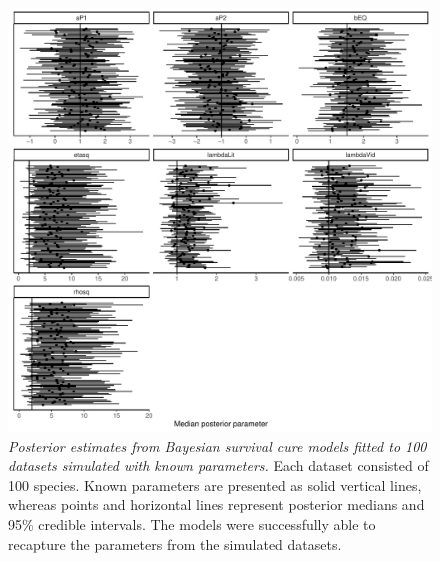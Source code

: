 \documentclass[
  man,floatsintext]{apa6}
\begin{document}
\begin{figure}
\centering
\includegraphics{manuscript_files/figure-latex/plotSurvCureSim-1.pdf}
\caption{\label{fig:plotSurvCureSim}\emph{Posterior estimates from Bayesian survival cure models fitted to 100 datasets simulated with known parameters.} Each dataset consisted of 100 species. Known parameters are presented as solid vertical lines, whereas points and horizontal lines represent posterior medians and 95\% credible intervals. The models were successfully able to recapture the parameters from the simulated datasets.}
\end{figure}
\end{document}
